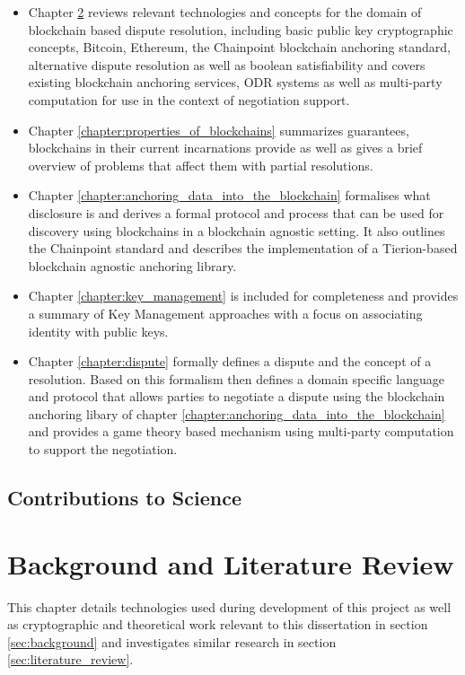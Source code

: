 \documentclass[12pt,msc,a4paper,oneside]{ucl_thesis}
\begin{document}
\begin{itemize}
    \item Chapter \ref{chapter:background_and_literature} reviews relevant technologies and concepts for the domain of blockchain based dispute resolution, including basic public key cryptographic concepts, Bitcoin, Ethereum, the Chainpoint blockchain anchoring standard, alternative dispute resolution as well as boolean satisfiability and covers existing blockchain anchoring services, ODR systems as well as multi-party computation for use in the context of negotiation support.

    \item Chapter \ref{chapter:properties_of_blockchains} summarizes guarantees, blockchains in their current incarnations provide as well as gives a brief overview of problems that affect them with partial resolutions.

    \item Chapter \ref{chapter:anchoring_data_into_the_blockchain} formalises what disclosure is and derives a formal protocol and process that can be used for discovery using blockchains in a blockchain agnostic setting. It also outlines the Chainpoint standard and describes the implementation of a Tierion-based blockchain agnostic anchoring library.

    \item Chapter \ref{chapter:key_management} is included for completeness and provides a summary of Key Management approaches with a focus on associating identity with public keys.

    \item Chapter \ref{chapter:dispute} formally defines a dispute and the concept of a resolution. Based on this formalism then defines a domain specific language and protocol that allows parties to negotiate a dispute using the blockchain anchoring libary of chapter \ref{chapter:anchoring_data_into_the_blockchain} and provides a game theory based mechanism using multi-party computation to support the negotiation.
\end{itemize}


\section{Contributions to Science}


\chapter{Background and Literature Review}
\label{chapter:background_and_literature}
This chapter details technologies used during development of this project as well as cryptographic and theoretical work relevant to this dissertation in section \ref{sec:background} and investigates similar research in section \ref{sec:literature_review}.
\end{document}
